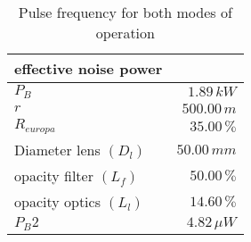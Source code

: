 \begin{table}[H]
\centering
\caption{Pulse frequency for both modes of operation}
\label{tab:effective_noise_power}
\begin{tabular}{|l|r|}\hline
    \textbf{effective noise power} & \\
    \hline 
    $P_B$ & $1.89\,k W$ \\
    $r$ & $500.00\, m$ \\
    $R_{europa}$ & $35.00\, \%$ \\
    Diameter lens $(D_l)$ & $50.00\,m m$ \\
    opacity filter $(L_f)$ & $50.00\, \%$ \\
    opacity optics $(L_l)$ & $14.60\, \%$ \\
    $P_B2$ & $4.82\,\mu W$ \\
    \hline 
\end{tabular}
\end{table}
